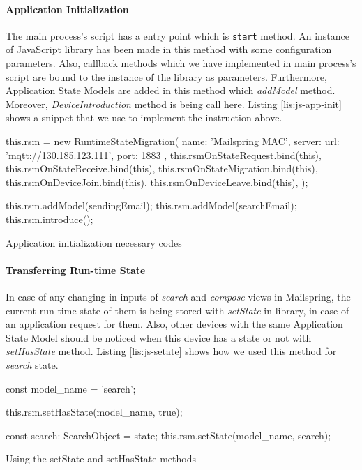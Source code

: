 \paragraph{Application Initialization}
The main process's script has a entry point which is \lstinline[basicstyle=\ttfamily]{start} method. An instance of JavaScript library has been made in this method with some configuration parameters. Also, callback methods which we have implemented in main process's script are bound to the instance of the library as parameters. Furthermore, 
Application State Models are added in this method which \textit{addModel} method. Moreover, \textit{DeviceIntroduction} method is being call here. Listing \ref{lis:js-app-init} shows a snippet that we use to implement the instruction above.

\FloatBarrier
\begin{code}
\begin{js2}
this.rsm = new RuntimeStateMigration(
  { 
    name: 'Mailspring MAC',
    server: {
        url: 'mqtt://130.185.123.111',
        port: 1883
    }
  },
  this.rsmOnStateRequest.bind(this),
  this.rsmOnStateReceive.bind(this),
  this.rsmOnStateMigration.bind(this),
  this.rsmOnDeviceJoin.bind(this),
  this.rsmOnDeviceLeave.bind(this),
);

this.rsm.addModel(sendingEmail);
this.rsm.addModel(searchEmail);
this.rsm.introduce();
\end{js2}
\caption{Application initialization necessary codes}
\label{lis:js-app-init}
\end{code}
\FloatBarrier

\paragraph{Transferring Run-time State}
In case of any changing in inputs of \textit{search} and \textit{compose} views in Mailspring, the current run-time state of them is being stored with \textit{setState} in library, in case of an application request for them. Also, other devices with the same Application State Model should be noticed when this device has a state or not with \textit{setHasState} method. Listing \ref{lis:js-setate} shows how we used this method for \textit{search} state.

\FloatBarrier
\begin{code}
\begin{js2}
const model_name = 'search';

this.rsm.setHasState(model_name, true);

const search: SearchObject = state;
this.rsm.setState(model_name, search);
\end{js2}
\caption{Using the setState and setHasState methods}
\label{lis:js-setate}
\end{code}
\FloatBarrier


